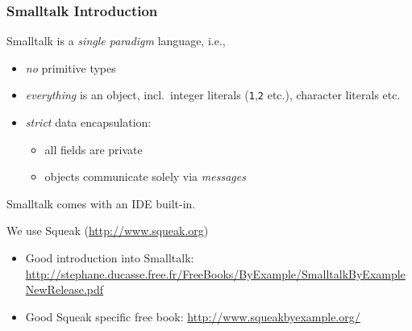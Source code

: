 \documentclass[handout]{beamer}
\begin{document}
\begin{frame}[fragile]
\frametitle{Smalltalk Introduction}

Smalltalk is a \emph{single paradigm} language, i.e.,
\begin{itemize}
  \item \emph{no} primitive types 
  \item \emph{everything} is an object, incl.\ integer
    literals (\texttt{1},\texttt{2} etc.), character literals etc.
  \item \emph{strict} data encapsulation:
    \begin{itemize}
    \item all fields are private
    \item objects communicate solely via \emph{messages}
    \end{itemize}
\end{itemize}

\bigskip\pause

Smalltalk comes with an IDE built-in.

\bigskip

We use Squeak (\url{http://www.squeak.org})

\begin{itemize}
  \item Good introduction into Smalltalk: \url{http://stephane.ducasse.free.fr/FreeBooks/ByExample/SmalltalkByExampleNewRelease.pdf}
  \item Good Squeak specific free book: \url{http://www.squeakbyexample.org/}
\end{itemize}

\end{frame}


\end{document}
